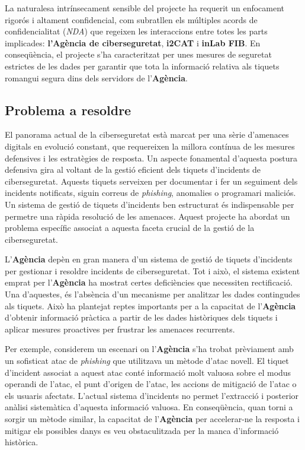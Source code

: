 La naturalesa intrínsecament sensible del projecte ha requerit un enfocament rigorós i altament confidencial, com subratllen els múltiples acords de confidencialitat (\textit{NDA}) que regeixen les interaccions entre totes les parts implicades: \textbf{l'Agència de ciberseguretat}, \textbf{i2CAT} i \textbf{inLab FIB}. En conseqüència, el projecte s'ha caracteritzat per unes mesures de seguretat estrictes de les dades per garantir que tota la informació relativa als tiquets romangui segura dins dels servidors de l'\textbf{Agència}.


\subsection{Problema a resoldre} \label{ssec:problema-resoldre}
El panorama actual de la ciberseguretat està marcat per una sèrie d'amenaces digitals en evolució constant, que requereixen la millora contínua de les mesures defensives i les estratègies de resposta. Un aspecte fonamental d'aquesta postura defensiva gira al voltant de la gestió eficient dels tiquets d'incidents de ciberseguretat. Aquests tiquets serveixen per documentar i fer un seguiment dels incidents notificats, siguin correus de \textit{phishing}, anomalies o programari maliciós. Un sistema de gestió de tiquets d'incidents ben estructurat és indispensable per permetre una ràpida resolució de les amenaces. Aquest projecte ha abordat un problema específic associat a aquesta faceta crucial de la gestió de la ciberseguretat.

L'\textbf{Agència} depèn en gran manera d'un sistema de gestió de tiquets d'incidents per gestionar i resoldre incidents de ciberseguretat. Tot i això, el sistema existent emprat per l'\textbf{Agència} ha mostrat certes deficiències que necessiten rectificació. Una d'aquestes, és l'absència d'un mecanisme per analitzar les dades contingudes als tiquets. Això ha plantejat reptes importants per a la capacitat de l'\textbf{Agència} d'obtenir informació pràctica a partir de les dades històriques dels tiquets i aplicar mesures proactives per frustrar les amenaces recurrents.

Per exemple, considerem un escenari on l'\textbf{Agència} s'ha trobat prèviament amb un sofisticat atac de \textit{phishing} que utilitzava un mètode d'atac novell. El tiquet d'incident associat a aquest atac conté informació molt valuosa sobre el modus operandi de l'atac, el punt d'origen de l'atac, les accions de mitigació de l'atac o els usuaris afectats. L'actual sistema d'incidents no permet l'extracció i posterior anàlisi sistemàtica d'aquesta informació valuosa. En conseqüència, quan torni a sorgir un mètode similar, la capacitat de l'\textbf{Agència} per accelerar-ne la resposta i mitigar els possibles danys es veu obstaculitzada per la manca d'informació històrica.

